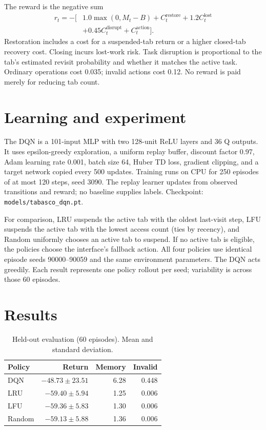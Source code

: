 \documentclass[10pt,twocolumn]{article}
\begin{document}
The reward is the negative sum
\begin{align*}
r_t=-[&1.0\max(0,M_t-B)+C^{\text{restore}}_t+1.2C^{\text{lost}}_t\\
&+0.45C^{\text{disrupt}}_t+C^{\text{action}}_t].
\end{align*}
Restoration includes a cost for a suspended-tab return or a higher closed-tab recovery cost. Closing incurs lost-work risk. Task disruption is proportional to the tab's estimated revisit probability and whether it matches the active task. Ordinary operations cost 0.035; invalid actions cost 0.12. No reward is paid merely for reducing tab count.

\section{Learning and experiment}
The DQN is a 101-input MLP with two 128-unit ReLU layers and 36 Q outputs. It uses epsilon-greedy exploration, a uniform replay buffer, discount factor 0.97, Adam learning rate 0.001, batch size 64, Huber TD loss, gradient clipping, and a target network copied every 500 updates. Training runs on CPU for 250 episodes of at most 120 steps, seed 3090. The replay learner updates from observed transitions and reward; no baseline supplies labels. Checkpoint: \texttt{models/tabasco\_dqn.pt}.

For comparison, LRU suspends the active tab with the oldest last-visit step, LFU suspends the active tab with the lowest access count (ties by recency), and Random uniformly chooses an active tab to suspend. If no active tab is eligible, the policies choose the interface's fallback action. All four policies use identical episode seeds 90000--90059 and the same environment parameters. The DQN acts greedily. Each result represents one policy rollout per seed; variability is across those 60 episodes.

\section{Results}
\begin{table}[h]\centering\small
\caption{Held-out evaluation (60 episodes). Mean and standard deviation.}
\begin{tabular}{lrrr}\toprule
Policy & Return & Memory & Invalid\\\midrule
DQN & $-48.73\pm23.51$ & 6.28 & 0.448\\
LRU & $-59.40\pm5.94$ & 1.25 & 0.006\\
LFU & $-59.36\pm5.83$ & 1.30 & 0.006\\
Random & $-59.13\pm5.88$ & 1.36 & 0.006\\\bottomrule
\end{tabular}\end{table}
\end{document}
